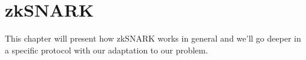 \chapter{zkSNARK}
This chapter will present how zkSNARK works in general and we'll go deeper in a specific protocol with our adaptation to our problem. \\



